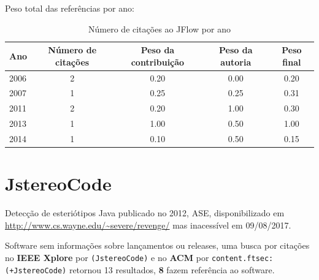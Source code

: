 Peso total das referências por ano:

\begin{table}[h]
\caption{Número de citações ao JFlow por ano}
\centering
\begin{tabular}{| l | c | c | c | c |}
  \hline
  Ano & Número de citações & Peso da contribuição & Peso da autoria & Peso final \\
  \hline
  2006
    & 2
    & 0.20
    & 0.00
    & 0.20 \\
  2007
    & 1
    & 0.25
    & 0.25
    & 0.31 \\
  2011
    & 2
    & 0.20
    & 1.00
    & 0.30 \\
  2013
    & 1
    & 1.00
    & 0.50
    & 1.00 \\
  2014
    & 1
    & 0.10
    & 0.50
    & 0.15 \\
  \hline
\end{tabular}
\end{table}


\section{JstereoCode}

Detecção de esteriótipos Java
publicado no 2012, ASE,
disponibilizado em \url{http://www.cs.wayne.edu/~severe/revenge/}
mas inacessível em 09/08/2017.

Software sem informações sobre lançamentos ou releases,
uma busca por citações no {\bf IEEE Xplore} por
\texttt{(JstereoCode)}
e no {\bf ACM} por
\texttt{content.ftsec:(+JstereoCode)}
retornou
13 resultados,
{\bf 8} fazem referência ao software.

